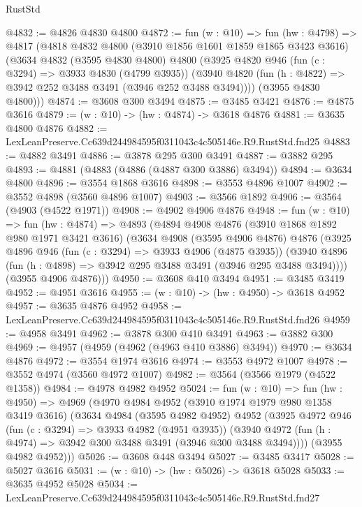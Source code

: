 \begin{lexlean}{RustStd}
\begin{coremodule}
@4832 := @4826 @4830 @4800
@4872 := fun (w : @10) =>
  fun (hw : @4798) =>
  @4817
    (@4818
      @4832
      @4800
      (@3910 @1856 @1601 @1859 @1865 @3423 @3616)
      (@3634
        @4832
        (@3595 @4830 @4800)
        @4800
        (@3925
          @4820
          @946
          (fun (c : @3294) => @3933 @4830 (@4799 @3935))
          (@3940 @4820 (fun (h : @4822) => @3942 @252 @3488 @3491 (@3946 @252 @3488 @3494))))
        (@3955 @4830 @4800)))
@4874 := @3608 @300 @3494
@4875 := @3485 @3421
@4876 := @4875 @3616
@4879 := (w : @10) -> (hw : @4874) -> @3618 @4876
@4881 := @3635 @4800 @4876
@4882 := LexLeanPreserve.Cc639d244984595f0311043c4c505146e.R9.RustStd.fnd25
@4883 := @4882 @3491
@4886 := @3878 @295 @300 @3491
@4887 := @3882 @295
@4893 := @4881 (@4883 (@4886 (@4887 @300 @3886) @3494))
@4894 := @3634 @4800
@4896 := @3554 @1868 @3616
@4898 := @3553 @4896 @1007
@4902 := @3552 @4898 (@3560 @4896 @1007)
@4903 := @3566 @1892
@4906 := @3564 (@4903 (@4522 @1971))
@4908 := @4902 @4906 @4876
@4948 := fun (w : @10) =>
  fun (hw : @4874) =>
  @4893
    (@4894
      @4908
      @4876
      (@3910 @1868 @1892 @980 @1971 @3421 @3616)
      (@3634
        @4908
        (@3595 @4906 @4876)
        @4876
        (@3925
          @4896
          @946
          (fun (c : @3294) => @3933 @4906 (@4875 @3935))
          (@3940 @4896 (fun (h : @4898) => @3942 @295 @3488 @3491 (@3946 @295 @3488 @3494))))
        (@3955 @4906 @4876)))
@4950 := @3608 @410 @3494
@4951 := @3485 @3419
@4952 := @4951 @3616
@4955 := (w : @10) -> (hw : @4950) -> @3618 @4952
@4957 := @3635 @4876 @4952
@4958 := LexLeanPreserve.Cc639d244984595f0311043c4c505146e.R9.RustStd.fnd26
@4959 := @4958 @3491
@4962 := @3878 @300 @410 @3491
@4963 := @3882 @300
@4969 := @4957 (@4959 (@4962 (@4963 @410 @3886) @3494))
@4970 := @3634 @4876
@4972 := @3554 @1974 @3616
@4974 := @3553 @4972 @1007
@4978 := @3552 @4974 (@3560 @4972 @1007)
@4982 := @3564 (@3566 @1979 (@4522 @1358))
@4984 := @4978 @4982 @4952
@5024 := fun (w : @10) =>
  fun (hw : @4950) =>
  @4969
    (@4970
      @4984
      @4952
      (@3910 @1974 @1979 @980 @1358 @3419 @3616)
      (@3634
        @4984
        (@3595 @4982 @4952)
        @4952
        (@3925
          @4972
          @946
          (fun (c : @3294) => @3933 @4982 (@4951 @3935))
          (@3940 @4972 (fun (h : @4974) => @3942 @300 @3488 @3491 (@3946 @300 @3488 @3494))))
        (@3955 @4982 @4952)))
@5026 := @3608 @448 @3494
@5027 := @3485 @3417
@5028 := @5027 @3616
@5031 := (w : @10) -> (hw : @5026) -> @3618 @5028
@5033 := @3635 @4952 @5028
@5034 := LexLeanPreserve.Cc639d244984595f0311043c4c505146e.R9.RustStd.fnd27

\end{coremodule}
\end{lexlean}
